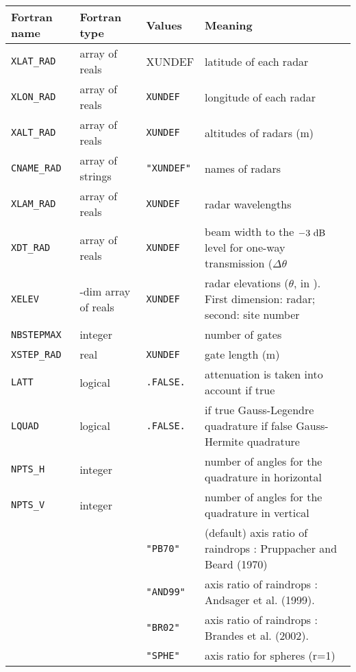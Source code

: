 \begin{center}
\begin{tabular}{|>{\centering}p{2.6cm}|>{\centering}p{3.5cm}|>{\centering}p{1.5cm}| p{8.2cm}|}\hline
Fortran name      &Fortran type&Values& Meaning\\\hline \hline
\tt XLAT\_RAD     &array of reals & XUNDEF&latitude of each radar\\\hline
\tt XLON\_RAD     &array of reals & \tt XUNDEF&longitude of each radar\\\hline
\tt XALT\_RAD     &array of reals & \tt XUNDEF&altitudes of radars (m)\\\hline
\tt CNAME\_RAD    &array of strings & \tt "XUNDEF"&names of radars\\\hline
\tt XLAM\_RAD     &array of reals &  \tt XUNDEF&radar wavelengths\\\hline
\tt XDT\_RAD      & array of reals&  \tt XUNDEF&beam width to the $-3\rm~dB$ level for one-way transmission ($\Delta\theta$\\\hline
\tt XELEV         & 2-dim array of reals&  \tt XUNDEF&radar elevations ($\theta$, in \char23). First dimension: radar; second: site number\\\hline
\tt NBSTEPMAX     &integer & -1&number of gates\\\hline
\tt XSTEP\_RAD    &real& \tt XUNDEF&gate length (m)\\\hline
\tt LATT          & logical &\tt.FALSE.& attenuation is taken into account if true\\\hline
\tt LQUAD         & logical & \tt.FALSE.&if true Gauss-Legendre quadrature if false Gauss-Hermite quadrature\\\hline
\tt NPTS\_H       & integer & 1&number of angles for the quadrature in horizontal\\\hline
\tt NPTS\_V       & integer & 1&number of angles for the quadrature in vertical\\\hline
\multirow{4}{*}{\tt CARF} &\multirow{2}{*}{ string} &\tt "PB70"& (default) axis ratio of raindrops : Pruppacher and Beard (1970)\\\cline{3-4}
&&\tt"AND99"&axis ratio of raindrops : Andsager et al. (1999). \\\cline{3-4}
&&\tt"BR02"&axis ratio of raindrops : Brandes et al. (2002). \\\cline{3-4}
&&\tt"SPHE"&axis ratio for spheres (r=1)\\\hline


\end{tabular}
\end{center}
